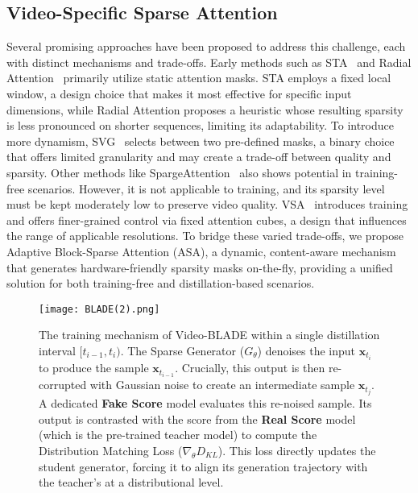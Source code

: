 \documentclass[letterpaper]{article} %
\begin{document}
\subsection{Video-Specific Sparse Attention}



Several promising approaches have been proposed to address this challenge, each with distinct mechanisms and trade-offs. Early methods such as STA~\cite{zhang2025fastvideogenerationsliding} and Radial Attention~\cite{li2025radialattentiononlogn} primarily utilize static attention masks. STA employs a fixed local window, a design choice that makes it most effective for specific input dimensions, while Radial Attention proposes a heuristic whose resulting sparsity is less pronounced on shorter sequences, limiting its adaptability. To introduce more dynamism, SVG~\cite{xi2025sparsevideogenacceleratingvideo} selects between two pre-defined masks, a binary choice that offers limited granularity and may create a trade-off between quality and sparsity. 
Other methods like SpargeAttention~\cite{zhang2025spargeattentionaccuratetrainingfreesparse} also shows potential in training-free scenarios. However, it is not applicable to training, and its sparsity level must be kept moderately low to preserve video quality.
VSA~\cite{zhang2025vsafastervideodiffusion} introduces training and offers finer-grained control via fixed attention cubes, a design that influences the range of applicable resolutions. To bridge these varied trade-offs, we propose Adaptive Block-Sparse Attention (ASA), a dynamic, content-aware mechanism that generates hardware-friendly sparsity masks on-the-fly, providing a unified solution for both training-free and distillation-based scenarios.

\begin{figure}[t]
\centering
\texttt{[image: BLADE(2).png]} %
\caption{The training mechanism of Video-BLADE within a single distillation interval $[t_{i-1}, t_i)$. The Sparse Generator ($G_{\theta}$) denoises the input $\mathbf{x}_{t_i}$ to produce the sample $\mathbf{x}_{t_{i-1}}$. Crucially, this output is then re-corrupted with Gaussian noise to create an intermediate sample $\mathbf{x}_{t_j}$. A dedicated \textbf{Fake Score} model evaluates this re-noised sample. Its output is contrasted with the score from the \textbf{Real Score} model (which is the pre-trained teacher model) to compute the Distribution Matching Loss ($\nabla_{\theta} D_{KL}$). This loss directly updates the student generator, forcing it to align its generation trajectory with the teacher's at a distributional level.}
\label{fig:workflow}
\end{figure}
\end{document}
